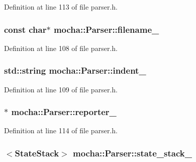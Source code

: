 Definition at line 113 of file parser.h.

\hypertarget{classmocha_1_1_parser_a6ce640ba66a27ff0309fcacd70e8ccf0}{
\subsubsection[{filename\_\-}]{\setlength{\rightskip}{0pt plus 5cm}const char$\ast$ {\bf mocha::Parser::filename\_\-}}}
\label{classmocha_1_1_parser_a6ce640ba66a27ff0309fcacd70e8ccf0}


Definition at line 108 of file parser.h.

\hypertarget{classmocha_1_1_parser_a539ea72fa95db59adfe32c7cbd73506d}{
\subsubsection[{indent\_\-}]{\setlength{\rightskip}{0pt plus 5cm}std::string {\bf mocha::Parser::indent\_\-}}}
\label{classmocha_1_1_parser_a539ea72fa95db59adfe32c7cbd73506d}


Definition at line 109 of file parser.h.

\hypertarget{classmocha_1_1_parser_aebb487c9fe126bab58b5c76e1995127d}{
\subsubsection[{reporter\_\-}]{$\ast$ {\bf mocha::Parser::reporter\_\-}}}
\label{classmocha_1_1_parser_aebb487c9fe126bab58b5c76e1995127d}


Definition at line 114 of file parser.h.

\hypertarget{classmocha_1_1_parser_a7c8173ec170938b02d0c812c47d15134}{
\subsubsection[{state\_\-stack\_\-}]{$<${\bf StateStack}$>$ {\bf mocha::Parser::state\_\-stack\_\-}}}
\label{classmocha_1_1_parser_a7c8173ec170938b02d0c812c47d15134}


